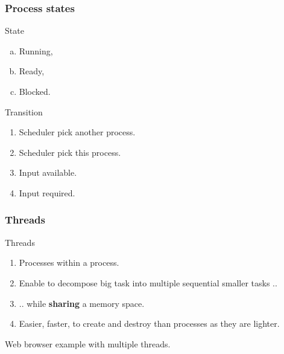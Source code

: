   \begin{frame}
    \frametitle{Process states}
        \begin{block}{State}
          \begin{enumerate}[a.]
            \item Running,
            \item Ready,
            \item Blocked.
          \end{enumerate}
        \end{block}
        \begin{block}{Transition}
          \begin{enumerate}[1.]
            \item Scheduler pick another process.
            \item Scheduler pick this process.
            \item Input available.
            \item Input required.
          \end{enumerate}
        \end{block}
  \end{frame}

  \begin{frame}
    \frametitle{Threads}
        \begin{block}{Threads}
          \begin{enumerate}
            \item Processes within a process.
            \item Enable to decompose big task into multiple sequential smaller tasks ..
            \item .. while \textbf{sharing} a memory space.
            \item Easier, faster, to create and destroy than processes as they are lighter.
          \end{enumerate}
        \end{block}
	Web browser example with multiple threads.
  \end{frame}

